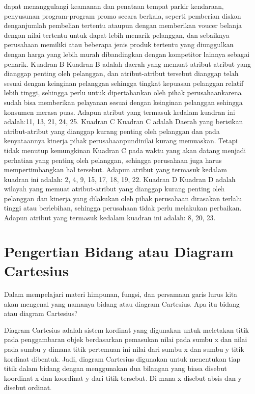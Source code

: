 dapat menanggulangi keamanan dan penataan tempat parkir kendaraan, penyusunan program-program promo secara berkala, seperti pemberian diskon denganjumlah pembelian tertentu ataupun dengan
memberikan voucer belanja dengan nilai tertentu untuk dapat lebih menarik pelanggan, dan sebaiknya perusahaan memiliki atau beberapa jenis produk tertentu
yang diunggulkan dengan harga yang lebih murah dibandingkan dengan kompetitor lainnya sebagai penarik.
Kuadran B
Kuadran B adalah daerah yang memuat atribut-atribut yang dianggap penting oleh pelanggan, dan atribut-atribut tersebut dianggap telah sesuai dengan keinginan
pelanggan sehingga tingkat kepuasan pelanggan relatif lebih tinggi, sehingga perlu untuk dipertahankan oleh pihak perusahaankarena sudah bisa memberikan pelayanan
sesuai dengan keinginan pelanggan sehingga konsumen merasa puas. Adapun atribut yang termasuk kedalam kuadran ini adalah:11, 13, 21, 24, 25.
Kuadran C
Kuadran C adalah Daerah yang berisikan atribut-atribut yang dianggap kurang penting oleh pelanggan dan pada kenyataannya kinerja pihak perusahaanpundinilai kurang memuaskan. Tetapi tidak
menutup kemungkinan Kuadran C pada waktu yang akan datang menjadi perhatian yang penting oleh pelanggan, sehingga perusahaan juga harus mempertimbangkan
hal tersebut. Adapun atribut yang termasuk kedalam kuadran ini adalah: 2, 4, 9, 15, 17, 18, 19, 22.
Kuadran D
Kuadran D adalah wilayah yang memuat atribut-atribut yang dianggap kurang penting oleh pelanggan dan kinerja yang dilakukan oleh pihak perusahaan dirasakan
terlalu tinggi atau berlebihan, sehingga perusahaan tidak perlu melakukan perbaikan. Adapun atribut yang termasuk kedalam kuadran ini adalah: 8, 20, 23.

\section{Pengertian Bidang atau Diagram Cartesius}

Dalam mempelajari materi himpunan, fungsi, dan persamaan garis lurus kita akan mengenal yang namanya bidang atau diagram Cartesius. Apa itu bidang atau diagram Cartesius?

Diagram Cartesius adalah sistem kordinat yang digunakan untuk meletakan titik pada penggambaran objek berdasarkan pemasukan nilai pada sumbu x dan nilai pada sumbu y dimana titik pertemuan ini nilai dari sumbu x dan sumbu y titik kordinat dibentuk. Jadi, diagram Cartesius digunakan untuk menentukan tiap titik dalam bidang dengan menggunakan dua bilangan yang biasa disebut koordinat x dan koordinat y dari titik tersebut. Di mana x disebut absis dan y disebut ordinat.

